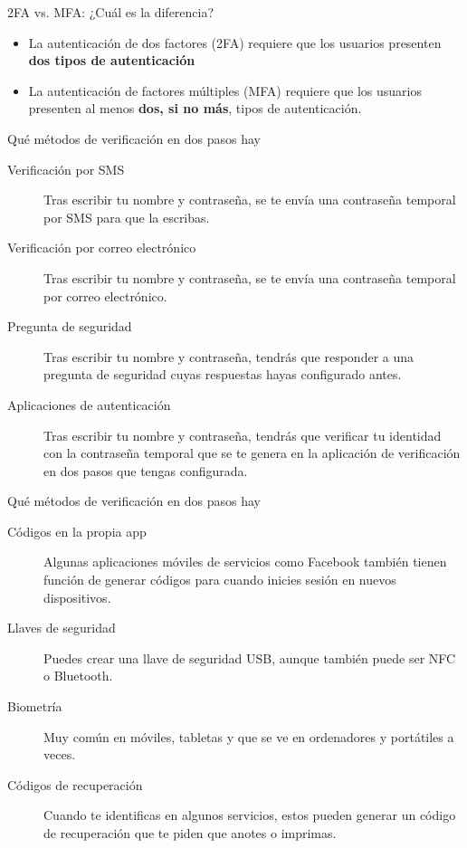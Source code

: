 \begin{frame}[c]{2FA vs. MFA: ¿Cuál es la diferencia?}
  \begin{itemize}
    \item La autenticación de dos factores (2FA) requiere que los
      usuarios presenten \textbf{dos tipos de autenticación}

    \pausa
    \item La autenticación de factores múltiples (MFA) requiere que
      los usuarios presenten al menos \textbf{dos, si no más},
      tipos de autenticación.
  \end{itemize}
\end{frame}

\begin{frame}[c]{Qué métodos de verificación en dos pasos hay}
  \begin{description}
    \item [Verificación por SMS] Tras escribir tu nombre y contraseña,
      se te envía una contraseña temporal por SMS para que la escribas.
    \pausa
    \item [Verificación por correo electrónico] Tras escribir tu nombre y
      contraseña, se te envía una contraseña temporal por correo electrónico. 
    \pausa
    \item [Pregunta de seguridad] Tras escribir tu nombre y contraseña,
      tendrás que responder a una pregunta de seguridad cuyas respuestas
      hayas configurado antes. 
    \pausa
    \item [Aplicaciones de autenticación] Tras escribir tu nombre y contraseña,
      tendrás que verificar tu identidad con la contraseña temporal que se te
      genera en la aplicación de verificación en dos pasos que tengas
      configurada. 
  \end{description}
\end{frame}

\begin{frame}[c]{Qué métodos de verificación en dos pasos hay}
  \begin{description}
    \item [Códigos en la propia app] Algunas aplicaciones móviles de servicios
      como Facebook también tienen función de generar códigos para cuando
      inicies sesión en nuevos dispositivos. 
    \pausa
    \item [Llaves de seguridad] Puedes crear una llave de seguridad USB,
      aunque también puede ser NFC o Bluetooth.
    \pausa
    \item [Biometría] Muy común en móviles, tabletas y que se ve en
      ordenadores y portátiles a veces. 
    \pausa
    \item [Códigos de recuperación] Cuando te identificas en algunos servicios,
      estos pueden generar un código de recuperación que te piden que anotes
      o imprimas. 
  \end{description}
\end{frame}

